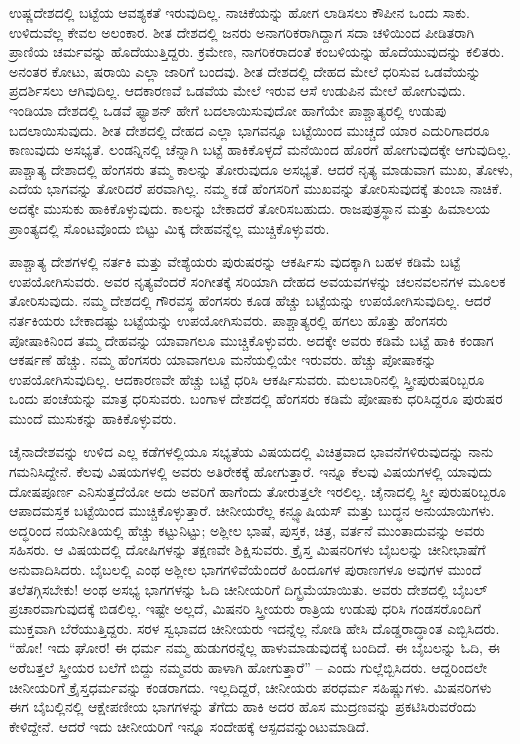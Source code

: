 ಉಷ್ಣದೇಶದಲ್ಲಿ ಬಟ್ಟೆಯ ಆವಶ್ಯಕತೆ ಇರುವುದಿಲ್ಲ. ನಾಚಿಕೆಯನ್ನು ಹೋಗ ಲಾಡಿಸಲು ಕೌಪೀನ ಒಂದು ಸಾಕು. ಉಳಿದುವೆಲ್ಲ ಕೇವಲ ಅಲಂಕಾರ. ಶೀತ ದೇಶದಲ್ಲಿ ಜನರು ಅನಾಗರಿಕರಾಗಿದ್ದಾಗ ಸದಾ ಚಳಿಯಿಂದ ಪೀಡಿತರಾಗಿ ಪ್ರಾಣಿಯ ಚರ್ಮವನ್ನು ಹೊದೆಯು\break ತ್ತಿದ್ದರು. ಕ್ರಮೇಣ, ನಾಗರಿಕರಾದಂತೆ ಕಂಬಳಿಯನ್ನು ಹೊದೆಯುವುದನ್ನು ಕಲಿತರು. ಅನಂತರ ಕೋಟು, ಷರಾಯಿ ಎಲ್ಲಾ ಜಾರಿಗೆ ಬಂದವು. ಶೀತ ದೇಶದಲ್ಲಿ ದೇಹದ ಮೇಲೆ ಧರಿಸುವ ಒಡವೆಯನ್ನು ಪ್ರದರ್ಶಿಸಲು ಆಗಿವುದಿಲ್ಲ. ಆದಕಾರಣವೆ ಒಡವೆಯ ಮೇಲೆ ಇರುವ ಆಸೆ ಉಡುಪಿನ ಮೇಲೆ ಹೋಗುವುದು. ಇಂಡಿಯಾ ದೇಶದಲ್ಲಿ ಒಡವೆ ಫ್ಯಾಶನ್​ ಹೇಗೆ ಬದಲಾಯಿಸುವುದೋ ಹಾಗೆಯೇ ಪಾಶ್ಚಾತ್ಯರಲ್ಲಿ ಉಡುಪು ಬದಲಾಯಿಸುವುದು. ಶೀತ ದೇಶದಲ್ಲಿ ದೇಹದ ಎಲ್ಲಾ ಭಾಗವನ್ನೂ ಬಟ್ಟೆಯಿಂದ ಮುಚ್ಚದೆ ಯಾರ ಎದುರಿಗಾದರೂ ಕಾಣುವುದು ಅಸಭ್ಯತೆ. ಲಂಡನ್ನಿನಲ್ಲಿ ಚೆನ್ನಾಗಿ ಬಟ್ಟೆ ಹಾಕಿಕೊಳ್ಳದೆ ಮನೆಯಿಂದ ಹೊರಗೆ ಹೋಗುವುದಕ್ಕೇ ಆಗುವುದಿಲ್ಲ. ಪಾಶ್ಚಾತ್ಯ ದೇಶಾದಲ್ಲಿ ಹೆಂಗಸರು ತಮ್ಮ ಕಾಲನ್ನು ತೋರು\break ವುದೂ ಅಸಭ್ಯತೆ. ಆದರೆ ನೃತ್ಯ ಮಾಡುವಾಗ ಮುಖ, ತೋಳು, ಎದೆಯ ಭಾಗವನ್ನು ತೋರಿದರೆ ಪರವಾಗಿಲ್ಲ. ನಮ್ಮ ಕಡೆ ಹೆಂಗಸರಿಗೆ ಮುಖವನ್ನು ತೋರಿಸುವುದಕ್ಕೆ ತುಂಬಾ ನಾಚಿಕೆ. ಅದಕ್ಕೇ ಮುಸುಕು ಹಾಕಿಕೊಳ್ಳುವುದು. ಕಾಲನ್ನು ಬೇಕಾದರೆ ತೋರಿಸಬಹುದು. ರಾಜಪುತ್ರಸ್ಥಾನ ಮತ್ತು ಹಿಮಾಲಯ ಪ್ರಾಂತ್ಯದಲ್ಲಿ ಸೊಂಟವೊಂದು ಬಿಟ್ಟು ಮಿಕ್ಕ ದೇಹ\break ವನ್ನೆಲ್ಲ ಮುಚ್ಚಿಕೊಳ್ಳುವರು.

ಪಾಶ್ಚಾತ್ಯ ದೇಶಗಳಲ್ಲಿ ನರ್ತಕಿ ಮತ್ತು ವೇಶ್ಯೆಯರು ಪುರುಷರನ್ನು ಆಕರ್ಷಿಸು ವುದಕ್ಕಾಗಿ ಬಹಳ ಕಡಿಮೆ ಬಟ್ಟೆ ಉಪಯೋಗಿಸುವರು. ಅವರ ನೃತ್ಯವೆಂದರೆ ಸಂಗೀತಕ್ಕೆ ಸರಿಯಾಗಿ ದೇಹದ ಅವಯವಗಳನ್ನು ಚಲನವಲನಗಳ ಮೂಲಕ ತೋರಿಸುವುದು. ನಮ್ಮ ದೇಶದಲ್ಲಿ ಗೌರವಸ್ಥ ಹೆಂಗಸರು ಕೂಡ ಹೆಚ್ಚು ಬಟ್ಟೆಯನ್ನು ಉಪಯೋಗಿಸುವುದಿಲ್ಲ. ಆದರೆ ನರ್ತಕಿಯರು ಬೇಕಾದಷ್ಟು ಬಟ್ಟೆಯನ್ನು ಉಪಯೋಗಿಸುವರು. ಪಾಶ್ಚಾತ್ಯರಲ್ಲಿ ಹಗಲು ಹೊತ್ತು ಹೆಂಗಸರು ಪೋಷಾಕಿನಿಂದ ತಮ್ಮ ದೇಹವನ್ನು ಯಾವಾಗಲೂ ಮುಚ್ಚಿಕೊಳ್ಳುವರು. ಅದಕ್ಕೇ ಅವರು ಕಡಿಮೆ ಬಟ್ಟೆ ಹಾಕಿ ಕಂಡಾಗ ಆಕರ್ಷಣೆ ಹೆಚ್ಚು. ನಮ್ಮ ಹೆಂಗಸರು ಯಾವಾಗಲೂ ಮನೆಯಲ್ಲಿಯೇ ಇರುವರು. ಹೆಚ್ಚು ಪೋಷಾಕನ್ನು ಉಪಯೋಗಿಸುವುದಿಲ್ಲ. ಆದಕಾರಣವೇ ಹೆಚ್ಚು ಬಟ್ಟೆ ಧರಿಸಿ ಆಕರ್ಷಿಸುವರು. ಮಲಬಾರಿನಲ್ಲಿ ಸ್ತ್ರೀಪುರುಷರಿಬ್ಬರೂ ಒಂದು ಪಂಚೆಯನ್ನು ಮಾತ್ರ ಧರಿಸುವರು. ಬಂಗಾಳ ದೇಶದಲ್ಲಿ ಹೆಂಗಸರು ಕಡಿಮೆ ಪೋಷಾಕು ಧರಿಸಿದ್ದರೂ ಪುರುಷರ ಮುಂದೆ ಮುಸುಕನ್ನು ಹಾಕಿಕೊಳ್ಳುವರು.

ಚೈನಾದೇಶವನ್ನು ಉಳಿದ ಎಲ್ಲ ಕಡೆಗಳಲ್ಲಿಯೂ ಸಭ್ಯತೆಯ ವಿಷಯದಲ್ಲಿ ವಿಚಿತ್ರವಾದ ಭಾವನೆಗಳಿರುವುದನ್ನು ನಾನು ಗಮನಿಸಿದ್ದೇನೆ. ಕೆಲವು ವಿಷಯಗಳಲ್ಲಿ ಅವರು ಅತಿರೇಕಕ್ಕೆ ಹೋಗುತ್ತಾರೆ. ಇನ್ನೂ ಕೆಲವು ವಿಷಯಗಳಲ್ಲಿ ಯಾವುದು ದೋಷಪೂರ್ಣ ಎನಿಸುತ್ತದೆಯೋ ಅದು ಅವರಿಗೆ ಹಾಗೆಂದು ತೋರುತ್ತಲೇ ಇರಲಿಲ್ಲ. ಚೈನಾದಲ್ಲಿ ಸ್ತ್ರೀ ಪುರುಷರಿಬ್ಬರೂ ಆಪಾದಮಸ್ತಕ ಬಟ್ಟೆಯಿಂದ ಮುಚ್ಚಿಕೊಳ್ಳುತ್ತಾರೆ. ಚೀನೀಯರೆಲ್ಲ ಕನ್ಫ್ಯೂಷಿ\break ಯಸ್​ ಮತ್ತು ಬುದ್ಧನ ಅನುಯಾಯಿಗಳು. ಅದ್ಧರಿಂದ ನಯನೀತಿಯಲ್ಲಿ ಹೆಚ್ಚು ಕಟ್ಟುನಿಟ್ಟು; ಅಶ್ಲೀಲ ಭಾಷೆ, ಪುಸ್ತಕ, ಚಿತ್ರ, ವರ್ತನೆ ಮುಂತಾದುವನ್ನು ಅವರು ಸಹಿಸರು. ಆ ವಿಷಯದಲ್ಲಿ ದೋಷಿಗಳನ್ನು ತಕ್ಷಣವೇ ಶಿಕ್ಷಿಸುವರು. ಕ್ರೈಸ್ತ ಮಿಷನರಿಗಳು ಬೈಬಲನ್ನು ಚೀನೀಭಾಷೆಗೆ ಅನುವಾದಿಸಿದರು. ಬೈಬಲಲ್ಲಿ ಎಂಥ ಅಶ್ಲೀಲ ಭಾಗಗಳಿವೆಯೆಂದರೆ ಹಿಂದೂ\break ಗಳ ಪುರಾಣಗಳೂ ಅವುಗಳ ಮುಂದೆ ತಲೆತಗ್ಗಿಸಬೇಕು! ಅಂಥ ಅಸಭ್ಯ ಭಾಗಗಳನ್ನು ಓದಿ ಚೀನೀಯರಿಗೆ ದಿಗ್ಭ್ರಮೆಯಾಯಿತು. ಅವರು ದೇಶದಲ್ಲಿ ಬೈಬಲ್​ ಪ್ರಚಾರವಾಗುವುದಕ್ಕೆ ಬಿಡಲಿಲ್ಲ. ಇಷ್ಟೇ ಅಲ್ಲದೆ, ಮಿಷನರಿ ಸ್ತ್ರೀಯರು ರಾತ್ರಿಯ ಉಡುಪು ಧರಿಸಿ ಗಂಡಸರೊಂದಿಗೆ ಮುಕ್ತವಾಗಿ ಬೆರೆಯುತ್ತಿದ್ದರು. ಸರಳ ಸ್ವಭಾವದ ಚೀನೀಯರು ಇದನ್ನೆಲ್ಲ ನೋಡಿ ಹೇಸಿ ದೊಡ್ಡರಾದ್ಧಾಂತ ಎಬ್ಬಿಸಿದರು. “ಹೋ! ಇದು ಘೋರ! ಈ ಧರ್ಮ ನಮ್ಮ ಹುಡುಗರನ್ನೆಲ್ಲ ಹಾಳುಮಾಡುವುದಕ್ಕೆ ಬಂದಿದೆ. ಈ ಬೈಬಲನ್ನು ಓದಿ, ಈ ಅರೆಬತ್ತಲೆ ಸ್ತ್ರೀಯರ ಬಲೆಗೆ ಬಿದ್ದು ನಮ್ಮವರು ಹಾಳಾಗಿ ಹೋಗುತ್ತಾರೆ” – ಎಂದು ಗುಲ್ಲೆಬ್ಬಿಸಿದರು. ಆದ್ದರಿಂದಲೇ ಚೀನೀಯರಿಗೆ ಕ್ರೈಸ್ತಧರ್ಮವನ್ನು ಕಂಡರಾಗದು. ಇಲ್ಲದಿದ್ದರೆ, ಚೀನೀಯರು ಪರಧರ್ಮ ಸಹಿಷ್ಣುಗಳು. ಮಿಷನರಿಗಳು ಈಗ ಬೈಬಲ್ಲಿನಲ್ಲಿ ಆಕ್ಷೇಪಣೀಯ ಭಾಗಗಳನ್ನು ತೆಗೆದು ಹಾಕಿ ಅದರ ಹೊಸ ಮುದ್ರಣವನ್ನು ಪ್ರಕಟಿಸಿರುವರೆಂದು ಕೇಳಿದ್ದೇನೆ. ಆದರೆ ಇದು ಚೀನೀಯರಿಗೆ ಇನ್ನೂ ಸಂದೇಹಕ್ಕೆ ಆಸ್ಪದವನ್ನುಂಟುಮಾಡಿದೆ.

